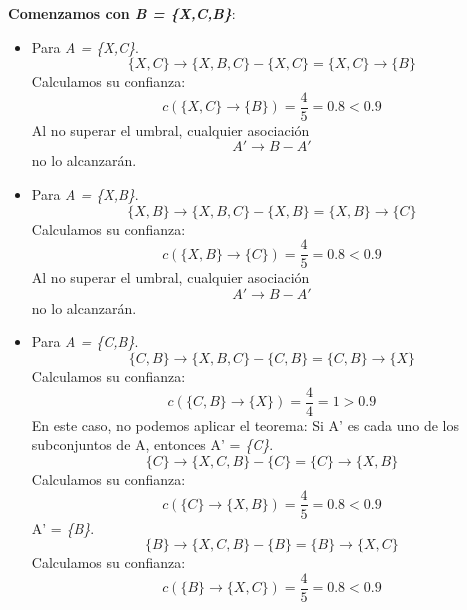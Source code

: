 \documentclass [a4paper] {article}
\begin{document}
\textbf{Comenzamos con \textit{B = \{X,C,B\}}}:

\begin{itemize}
    \item Para \textit{A = \{X,C\}}. \begin{equation*} \{X,C\} \rightarrow \{X,B,C\} - \{X,C\} = \{X,C\} \rightarrow \{B\} \end{equation*}
	Calculamos su confianza: \begin{equation*} c(\{X,C\} \rightarrow \{B\}) = \dfrac{4}{5} = 0.8 < 0.9 \end{equation*}
	Al no superar el umbral, cualquier asociación \begin{equation*} A' \rightarrow B - A' \end{equation*} no lo alcanzarán.

	\item Para \textit{A = \{X,B\}}. \begin{equation*} \{X,B\} \rightarrow \{X,B,C\} - \{X,B\} = \{X,B\} \rightarrow \{C\} \end{equation*}
	Calculamos su confianza: \begin{equation*} c(\{X,B\} \rightarrow \{C\}) = \dfrac{4}{5} = 0.8 < 0.9 \end{equation*}
	Al no superar el umbral, cualquier asociación \begin{equation*} A' \rightarrow B - A' \end{equation*} no lo alcanzarán.

	\item Para \textit{A = \{C,B\}}. \begin{equation*} \{C,B\} \rightarrow \{X,B,C\} - \{C,B\} = \{C,B\} \rightarrow \{X\} \end{equation*}
	Calculamos su confianza: \begin{equation*} c(\{C,B\} \rightarrow \{X\}) = \dfrac{4}{4} = 1 > 0.9 \end{equation*}
	En este caso, no podemos aplicar el teorema:
	Si A' es cada uno de los subconjuntos de A, entonces A' = \textit{\{C\}}.
	\begin{equation*} \{C\} \rightarrow \{X,C,B\} - \{C\} = \{C\} \rightarrow \{X,B\} \end{equation*}
	Calculamos su confianza: \begin{equation*} c(\{C\} \rightarrow \{X,B\}) = \dfrac{4}{5} = 0.8 < 0.9 \end{equation*}
	A' = \textit{\{B\}}.
	\begin{equation*} \{B\} \rightarrow \{X,C,B\} - \{B\} = \{B\} \rightarrow \{X,C\} \end{equation*}
	Calculamos su confianza: \begin{equation*} c(\{B\} \rightarrow \{X,C\}) = \dfrac{4}{5} = 0.8 < 0.9 \end{equation*}
\end{itemize}
\end{document}
